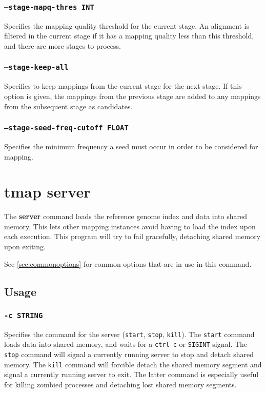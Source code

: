 \documentclass[a4paper,12pt]{book}
\newcommand{\TT}[1]{{\tt #1}} %
\newcommand{\BF}[1]{{\bf #1}} %
\begin{document}
\subsubsection{\TT{--stage-mapq-thres INT}}
Specifies the mapping quality threshold for the current stage.
An alignment is filtered in the current stage if it has a mapping quality less than this threshold, and there are more stages to process.
\subsubsection{\TT{--stage-keep-all}}
Specifies to keep mappings from the current stage for the next stage.
If this option is given, the mappings from the previous stage are added to any mappings from the subsequent stage as candidates.

\subsubsection{\TT{--stage-seed-freq-cutoff FLOAT}}
Specifies the minimum frequency a seed must occur in order to be considered for mapping.

\section{tmap server}
\label{sec:server}
The \BF{server} command loads the reference genome index and data into shared memory.
This lets other mapping instances avoid having to load the index upon each execution.
This program will try to fail gracefully, detaching shared memory upon exiting.

See \autoref{sec:commonoptions} for common options that are in use in this command.
\subsection{Usage}

\subsubsection{\TT{-c STRING}}
Specifies the command for the server (\TT{start}, \TT{stop}, \TT{kill}).
The \TT{start} command loads data into shared memory, and waits for a \TT{ctrl-c} or \TT{SIGINT} signal.
The \TT{stop} command will signal a currently running server to stop and detach shared memory.
The \TT{kill} command will forcible detach the shared memory segment and signal a currently running server to exit.
The latter command is especially useful for killing zombied processes and detaching lost shared memory segments.
\end{document}
